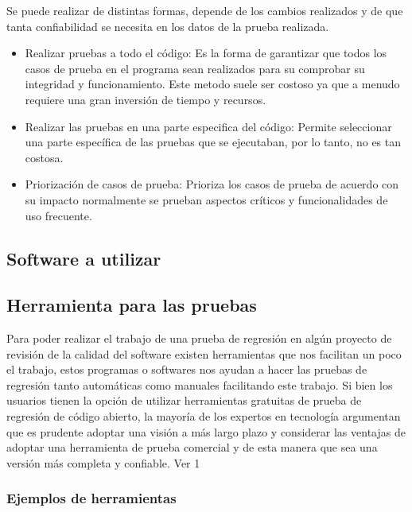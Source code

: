 \documentclass[conference]{IEEEtran}
\begin{document}
Se puede realizar de distintas formas, depende de los cambios realizados y de que tanta confiabilidad se necesita en los datos de la prueba realizada.

\begin{itemize}

\item Realizar pruebas a todo el código: Es la forma de garantizar que todos los casos de prueba en el programa sean realizados para su comprobar su integridad y funcionamiento. Este metodo suele ser costoso ya que a menudo requiere una gran inversión de tiempo y recursos.


\item Realizar las pruebas en una parte especifica del código:   
Permite seleccionar una parte específica de las pruebas que se ejecutaban, por lo tanto, no es tan costosa.

\item Priorización de casos de prueba: Prioriza los casos de prueba de acuerdo con su impacto normalmente se prueban aspectos críticos y funcionalidades de uso frecuente.

\end{itemize}


\subsection{Software a utilizar}



\subsection{Herramienta para las pruebas}

Para poder realizar el trabajo de una prueba de regresión en algún proyecto de revisión de la calidad del software existen herramientas que nos facilitan un poco el trabajo, estos programas o softwares nos ayudan a hacer las pruebas de regresión tanto automáticas como manuales facilitando este trabajo.
Si bien los usuarios tienen la opción de utilizar herramientas gratuitas de prueba de regresión de código abierto, la mayoría de los expertos en tecnología argumentan que es prudente adoptar una visión a más largo plazo y considerar las ventajas de adoptar una herramienta de prueba comercial y de esta manera que sea una versión más completa y confiable. Ver 1

\subsubsection{Ejemplos de herramientas}
\end{document}
